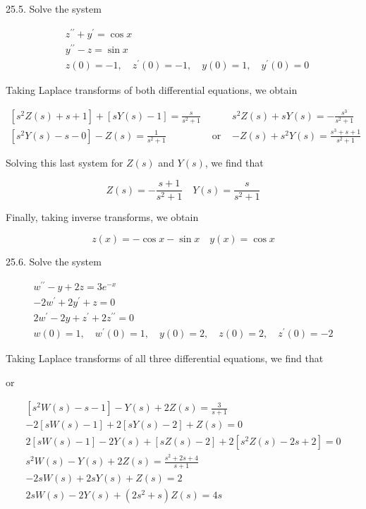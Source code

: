 \documentclass[10pt]{article}
\begin{document}
25.5. Solve the system

$$
\begin{aligned}
& z^{\prime \prime}+y^{\prime}=\cos x \\
& y^{\prime \prime}-z=\sin x \\
& z(0)=-1, \quad z^{\prime}(0)=-1, \quad y(0)=1, \quad y^{\prime}(0)=0
\end{aligned}
$$

Taking Laplace transforms of both differential equations, we obtain

$$
\begin{array}{lll}
{\left[s^{2} Z(s)+s+1\right]+[s Y(s)-1]=\frac{s}{s^{2}+1}} & & s^{2} Z(s)+s Y(s)=-\frac{s^{3}}{s^{2}+1} \\
{\left[s^{2} Y(s)-s-0\right]-Z(s)=\frac{1}{s^{2}+1}} & \text { or } & -Z(s)+s^{2} Y(s)=\frac{s^{3}+s+1}{s^{2}+1}
\end{array}
$$

Solving this last system for $Z(s)$ and $Y(s)$, we find that

$$
Z(s)=-\frac{s+1}{s^{2}+1} \quad Y(s)=\frac{s}{s^{2}+1}
$$

Finally, taking inverse transforms, we obtain

$$
z(x)=-\cos x-\sin x \quad y(x)=\cos x
$$

25.6. Solve the system

$$
\begin{gathered}
w^{\prime \prime}-y+2 z=3 e^{-x} \\
-2 w^{\prime}+2 y^{\prime}+z=0 \\
2 w^{\prime}-2 y+z^{\prime}+2 z^{\prime \prime}=0 \\
w(0)=1, \quad w^{\prime}(0)=1, \quad y(0)=2, \quad z(0)=2, \quad z^{\prime}(0)=-2
\end{gathered}
$$

Taking Laplace transforms of all three differential equations, we find that

or

$$
\begin{gathered}
{\left[s^{2} W(s)-s-1\right]-Y(s)+2 Z(s)=\frac{3}{s+1}} \\
-2[s W(s)-1]+2[s Y(s)-2]+Z(s)=0 \\
2[s W(s)-1]-2 Y(s)+[s Z(s)-2]+2\left[s^{2} Z(s)-2 s+2\right]=0 \\
s^{2} W(s)-Y(s)+2 Z(s)=\frac{s^{2}+2 s+4}{s+1} \\
-2 s W(s)+2 s Y(s)+Z(s)=2 \\
2 s W(s)-2 Y(s)+\left(2 s^{2}+s\right) Z(s)=4 s
\end{gathered}
$$
\end{document}
